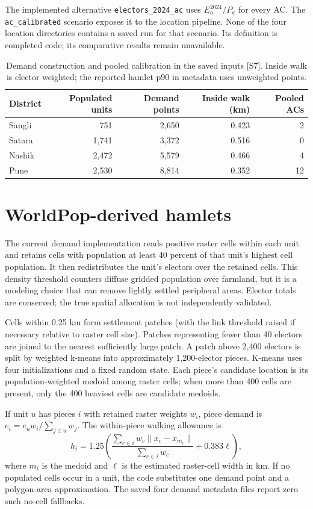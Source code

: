 \documentclass[11pt,a4paper,oneside]{report}
\newcommand{\source}[1]{\par\nopagebreak[4]{\footnotesize\color{teal}Evidence: #1.}\par}
\begin{document}
The implemented alternative \texttt{electors\_2024\_ac} uses $E_a^{2024}/P_a$ for every AC. The \texttt{ac\_calibrated} scenario exposes it to the location pipeline. None of the four location directories contains a saved run for that scenario. Its definition is completed code; its comparative results remain unavailable.
\source{[S7], [S9]}
\begin{table}[htbp]\centering
\small
\setlength{\tabcolsep}{5pt}
\caption{Demand construction and pooled calibration in the saved inputs [S7]. Inside walk is elector weighted; the reported hamlet p90 in metadata uses unweighted points.}
\begin{tabular}{lrrrr}
\toprule
District & Populated units & Demand points & Inside walk (km) & Pooled ACs\\
\midrule
Sangli & 751 & 2,650 & 0.423 & 2\\
Satara & 1,741 & 3,372 & 0.516 & 0\\
Nashik & 2,472 & 5,579 & 0.466 & 4\\
Pune & 2,530 & 8,814 & 0.352 & 12\\
\bottomrule\end{tabular}
\end{table}

\section{WorldPop-derived hamlets}
The current demand implementation reads positive raster cells within each unit and retains cells with population at least 40 percent of that unit's highest cell population. It then redistributes the unit's electors over the retained cells. This density threshold counters diffuse gridded population over farmland, but it is a modeling choice that can remove lightly settled peripheral areas. Elector totals are conserved; the true spatial allocation is not independently validated.

Cells within 0.25 km form settlement patches (with the link threshold raised if necessary relative to raster cell size). Patches representing fewer than 40 electors are joined to the nearest sufficiently large patch. A patch above 2,400 electors is split by weighted k-means into approximately 1,200-elector pieces. K-means uses four initializations and a fixed random state. Each piece's candidate location is its population-weighted medoid among raster cells; when more than 400 cells are present, only the 400 heaviest cells are candidate medoids.

If unit $u$ has pieces $i$ with retained raster weights $w_i$, piece demand is $e_i=e_u w_i/\sum_{j\in u}w_j$. The within-piece walking allowance is
\begin{equation}
 h_i=1.25\left(\frac{\sum_{c\in i}w_c\|x_c-x_{m_i}\|}{\sum_{c\in i}w_c}+0.383\ell\right),
\end{equation}
where $m_i$ is the medoid and $\ell$ is the estimated raster-cell width in km. If no populated cells occur in a unit, the code substitutes one demand point and a polygon-area approximation. The saved four demand metadata files report zero such no-cell fallbacks.
\end{document}
